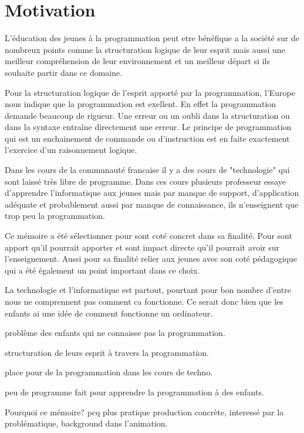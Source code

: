 \section{Motivation}
\label{intro-motivation}
L'éducation des jeunes à la programmation peut etre bénéfique a la société sur de nombreux points comme la structuration logique de leur esprit mais aussi une meilleur compréhension de leur environnement et un meilleur départ si ils souhaite partir dans ce domaine.

Pour la structuration logique de l'esprit apporté par la programmation, l'Europe nous indique que la programmation est exellent. En effet la programmation demande beaucoup de rigueur. Une erreur ou un oubli dans la structuration ou dans la syntaxe entraîne directement une erreur. Le principe de programmation qui est un enchainement de commande ou d'instruction est en faite exactement l'exercice d'un raisonnement logique.

Dans les cours de la communauté francaise il y a des cours de "technologie" qui sont laissé très libre de programme. Dans ces cours plusieurs professeur essaye d'apprendre l'informatique aux jeunes mais par manque de support, d'application adéquate et probablement aussi par manque de connaissance, ils n'enseignent que trop peu la programmation.

Ce mémoire a été sélectionner pour sont coté concret dans sa finalité. Pour sont apport qu'il pourrait apporter et sont impact directe qu'il pourrait avoir sur l'enseignement. Aussi pour sa finalité relier aux jeunes avec son coté pédagogique qui a été également un point important dans ce choix.

La technologie et l'informatique est partout, pourtant pour bon nombre d'entre nous ne comprennent pas comment ca fonctionne. Ce serait donc bien que les enfants ai une idée de comment fonctionne un ordinateur.

problème des enfants qui ne connaisse pas la programmation.

structuration de leurs esprit à travers la programmation.

place pour de la programmation dans les cours de techno.

peu de programme fait pour apprendre la programmation à des enfants.

Pourquoi ce mémoire? pcq plus pratique production concrète, interessé par la problématique, background dans l'animation.
